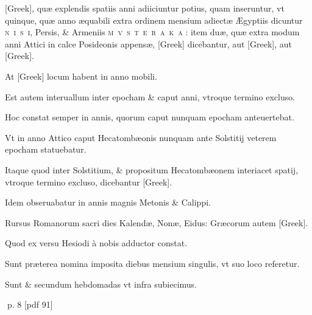 \begin{parnumbers}
\textgreek{[Greek]}, quæ explendis spatiis anni adiiciuntur potius, quam inseruntur, vt quinque, quæ anno æquabili extra ordinem mensium adiectæ Ægyptiis dicuntur \textsc{n~i~s~i}, Persis, \& Armeniis \textsc{m~v~s~t~e~r~a~k~a} : item duæ, quæ extra modum anni Attici in calce Posideonis  appensæ, \textgreek{[Greek]} dicebantur, aut \textgreek{[Greek]}, aut \textgreek{[Greek]}.

At \textgreek{[Greek]} locum habent in anno mobili.

Est autem interuallum inter epocham \& caput anni, vtroque termino excluso.

Hoc constat semper in annis, quorum caput nunquam epocham anteuertebat.

Vt in anno Attico caput Hecatombæonis nunquam ante Solstitij veterem epocham statuebatur.

Itaque quod inter Solstitium, \& propositum Hecatombæonem interiacet spatij, vtroque termino excluso, dicebantur \textgreek{[Greek]}.

Idem obseruabatur in annis magnis Metonis \& Calippi.

Rursus Romanorum sacri dies Kalendæ, Nonæ, Eidus: Græcorum autem \textgreek{[Greek]}.

Quod ex versu Hesiodi à nobis adductor constat.

Sunt præterea nomina imposita diebus mensium  singulis, vt suo loco referetur.

Sunt \& secundum hebdomadas vt infra subiecimus.
\end{parnumbers}
\clearpage
p. 8 [pdf 91]

